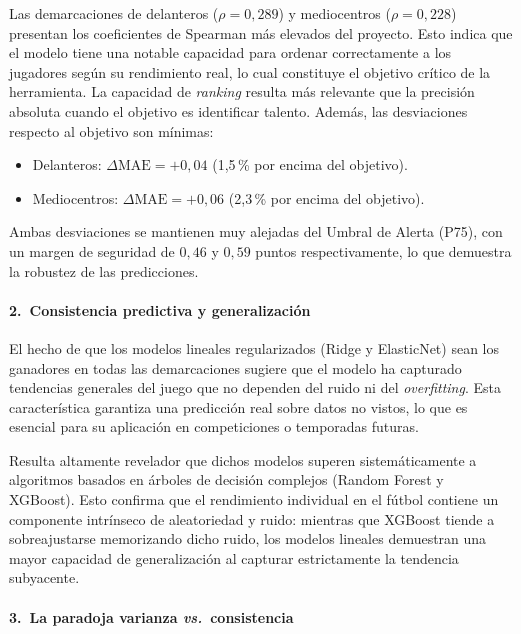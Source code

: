 Las demarcaciones de delanteros ($\rho = 0{,}289$) y mediocentros
($\rho = 0{,}228$) presentan los coeficientes de Spearman más elevados
del proyecto. Esto indica que el modelo tiene una notable capacidad para
ordenar correctamente a los jugadores según su rendimiento real, lo cual
constituye el objetivo crítico de la herramienta. La capacidad de
\textit{ranking} resulta más relevante que la precisión absoluta cuando
el objetivo es identificar talento. Además, las desviaciones respecto al
objetivo son mínimas:

\begin{itemize}
  \item Delanteros: $\Delta\mathrm{MAE} = +0{,}04$
        (1{,}5\,\% por encima del objetivo).
  \item Mediocentros: $\Delta\mathrm{MAE} = +0{,}06$
        (2{,}3\,\% por encima del objetivo).
\end{itemize}

Ambas desviaciones se mantienen muy alejadas del Umbral de Alerta (P75),
con un margen de seguridad de $0{,}46$ y $0{,}59$ puntos respectivamente,
lo que demuestra la robustez de las predicciones.

\paragraph{2.\ Consistencia predictiva y generalización}

El hecho de que los modelos lineales regularizados (Ridge y ElasticNet)
sean los ganadores en todas las demarcaciones sugiere que el modelo ha
capturado tendencias generales del juego que no dependen del ruido ni
del \textit{overfitting}. Esta característica garantiza una predicción
real sobre datos no vistos, lo que es esencial para su aplicación en
competiciones o temporadas futuras.

Resulta altamente revelador que dichos modelos superen sistemáticamente
a algoritmos basados en árboles de decisión complejos (Random Forest y
XGBoost). Esto confirma que el rendimiento individual en el fútbol
contiene un componente intrínseco de aleatoriedad y ruido: mientras que
XGBoost tiende a sobreajustarse memorizando dicho ruido, los modelos
lineales demuestran una mayor capacidad de generalización al capturar
estrictamente la tendencia subyacente.

\paragraph{3.\ La paradoja varianza \textit{vs.}\ consistencia}

